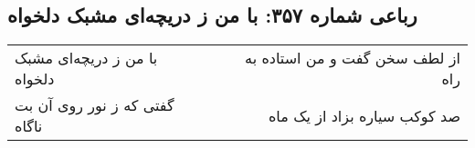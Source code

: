 \begin{center}
\section*{رباعی شماره ۳۵۷: با من ز دریچه‌ای مشبک دلخواه}
\label{sec:sh357}
\begin{longtable}{l p{0.5cm} r}
با من ز دریچه‌ای مشبک دلخواه
&&
از لطف سخن گفت و من استاده به راه
\\
گفتی که ز نور روی آن بت ناگاه
&&
صد کوکب سیاره بزاد از یک ماه
\\
\end{longtable}
\end{center}
